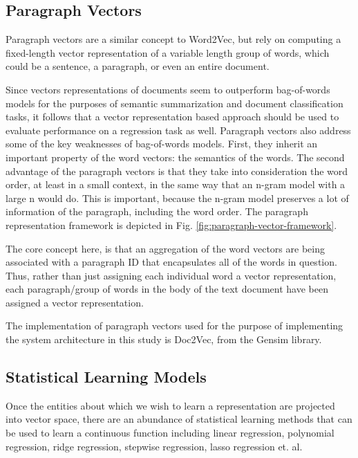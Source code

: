 \documentclass[conference]{IEEEtran}
\begin{document}
    \subsection{Paragraph Vectors} \label{paragraph_vectors}
        Paragraph vectors are a similar concept to Word2Vec, but rely on computing a fixed-length vector representation of a variable length group of words, which could be a sentence, a paragraph, or even an entire document.

        Since vectors representations of documents seem to outperform bag-of-words models for the purposes of semantic summarization and document classification tasks, it follows that a vector representation based approach should be used to evaluate performance on a regression task as well. 
        Paragraph vectors also address some of the key weaknesses of bag-of-words models. 
        First, they inherit an important property of the word vectors: the semantics of the words. 
        The second advantage of the paragraph vectors is that they take into consideration the word order, at least in a small context, in the same way that an n-gram model with a large n would do. 
        This is important, because the n-gram model preserves a lot of information of the paragraph, including the word order\cite{le2014distributed}.
        The paragraph representation framework is depicted in Fig. \ref{fig:paragraph-vector-framework}. 

        The core concept here, is that an aggregation of the word vectors are being associated with a paragraph ID that encapsulates all of the words in question. 
        Thus, rather than just assigning each individual word a vector representation, each paragraph/group of words in the body of the text document have been assigned a vector representation.

        The implementation of paragraph vectors used for the purpose of implementing the system architecture in this study is Doc2Vec, from the Gensim library\cite{doc2vec_api}.

    \subsection{Statistical Learning Models}
        Once the entities about which we wish to learn a representation are projected into vector space, there are an abundance of statistical learning methods that can be used to learn a continuous function including linear regression, polynomial regression, ridge regression, stepwise regression, lasso regression et. al.
\end{document}
